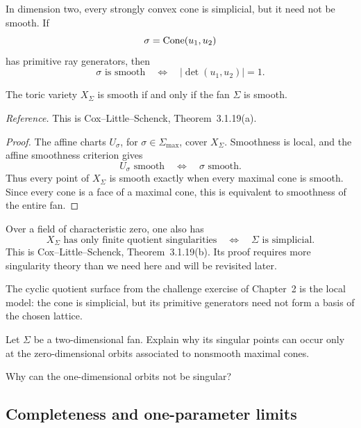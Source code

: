 In dimension two, every strongly convex cone is simplicial, but it
need not be smooth. If
\[
\sigma=\operatorname{Cone}(u_1,u_2)
\]
has primitive ray generators, then
\[
\sigma\text{ is smooth}
\quad\Longleftrightarrow\quad
|\det(u_1,u_2)|=1.
\]

\begin{theorem}
\label{thm:global-smoothness-criterion}
The toric variety \(X_\Sigma\) is smooth if and only if the fan
\(\Sigma\) is smooth.
\end{theorem}

\noindent
\textit{Reference.}
This is Cox--Little--Schenck, Theorem~3.1.19(a).

\begin{proof}
The affine charts \(U_\sigma\), for
\(\sigma\in\Sigma_{\max}\), cover \(X_\Sigma\). Smoothness is local,
and the affine smoothness criterion gives
\[
U_\sigma\text{ smooth}
\quad\Longleftrightarrow\quad
\sigma\text{ smooth}.
\]
Thus every point of \(X_\Sigma\) is smooth exactly when every maximal
cone is smooth. Since every cone is a face of a maximal cone, this is
equivalent to smoothness of the entire fan.
\end{proof}

\begin{observation}
Over a field of characteristic zero, one also has
\[
X_\Sigma\text{ has only finite quotient singularities}
\quad\Longleftrightarrow\quad
\Sigma\text{ is simplicial}.
\]
This is Cox--Little--Schenck, Theorem~3.1.19(b). Its proof requires
more singularity theory than we need here and will be revisited later.

The cyclic quotient surface from the challenge exercise of Chapter~2
is the local model: the cone is simplicial, but its primitive
generators need not form a basis of the chosen lattice.
\end{observation}

\begin{pauseandthink}
Let \(\Sigma\) be a two-dimensional fan. Explain why its singular
points can occur only at the zero-dimensional orbits associated to
nonsmooth maximal cones.

Why can the one-dimensional orbits not be singular?
\end{pauseandthink}

\subsection{Completeness and one-parameter limits}

